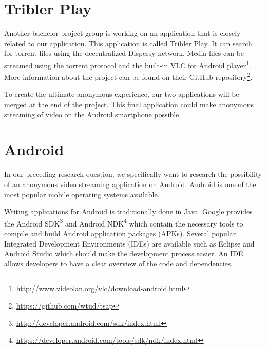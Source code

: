 	\section{Tribler Play}
	\label{sec:triblerplay}
		Another bachelor project group is working on an application that is closely related to our application. This application is called Tribler Play. It can search for torrent files using the decentralized Dispersy network. Media files can be streamed using the torrent protocol and the built-in VLC for Android player\footnote{\url{http://www.videolan.org/vlc/download-android.html}}. More information about the project can be found on their GitHub repository\footnote{\url{https://github.com/wtud/tsap}}.
		
		To create the ultimate anonymous experience, our two applications will be merged at the end of the project. This final application could make anonymous streaming of video on the Android smartphone possible.
		
	\section{Android}
		In our preceding research question, we specifically want to research the possibility of an anonymous video streaming application on Android. Android is one of the most popular mobile operating systems available. 
		
		Writing applications for Android is traditionally done in Java. Google provides the Android SDK\footnote{\url{http://developer.android.com/sdk/index.html}} and Android NDK\footnote{\url{https://developer.android.com/tools/sdk/ndk/index.html}} which contain the necessary tools to compile and build Android application packages (APKs). Several popular Integrated Development Environments (IDEs) are available such as Eclipse and Android Studio which should make the development process easier. An IDE allows developers to have a clear overview of the code and dependencies.